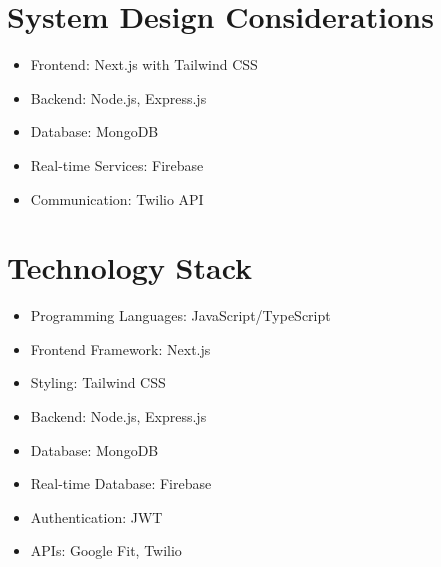 \section{System Design Considerations} 
\begin{itemize}
    \item Frontend: Next.js with Tailwind CSS
    \item Backend: Node.js, Express.js
    \item Database: MongoDB
    \item Real-time Services: Firebase
    \item Communication: Twilio API
\end{itemize}
\section{Technology Stack}
\begin{itemize}
    \item Programming Languages: JavaScript/TypeScript
    \item Frontend Framework: Next.js
    \item Styling: Tailwind CSS
    \item Backend: Node.js, Express.js
    \item Database: MongoDB
    \item Real-time Database: Firebase
    \item Authentication: JWT
    \item APIs: Google Fit, Twilio
\end{itemize}


